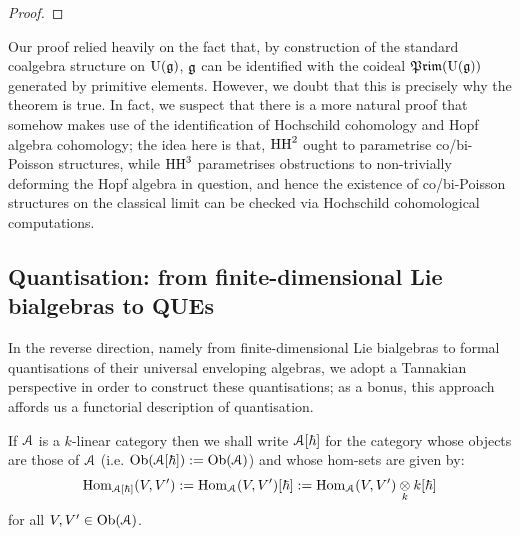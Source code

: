             \begin{proof}
                
            \end{proof}
        \begin{remark}
            Our proof relied heavily on the fact that, by construction of the standard coalgebra structure on $\mathrm{U}(\mathfrak{g})$, $\mathfrak{g}$ can be identified with the coideal $\mathfrak{Prim}(\mathrm{U}(\mathfrak{g}))$ generated by primitive elements. However, we doubt that this is precisely why the theorem is true. In fact, we suspect that there is a more natural proof that somehow makes use of the identification of Hochschild cohomology and Hopf algebra cohomology; the idea here is that, $\mathrm{HH}^2$ ought to parametrise co/bi-Poisson structures, while $\mathrm{HH}^3$ parametrises obstructions to non-trivially deforming the Hopf algebra in question, and hence the existence of co/bi-Poisson structures on the classical limit can be checked via Hochschild cohomological computations. 
        \end{remark}
    
    \subsection{Quantisation: from finite-dimensional Lie bialgebras to QUEs}
        In the reverse direction, namely from finite-dimensional Lie bialgebras to formal quantisations of their universal enveloping algebras, we adopt a Tannakian perspective in order to construct these quantisations; as a bonus, this approach affords us a functorial description of quantisation. 
        
        \begin{convention}
            If $\mathcal{A}$ is a $k$-linear category then we shall write $\mathcal{A}[\hbar]$ for the category whose objects are those of $\mathcal{A}$ (i.e. $\mathrm{Ob}(\mathcal{A}[\hbar]) := \mathrm{Ob}(\mathcal{A})$) and whose hom-sets are given by:
                $$\Hom_{\calA[\hbar]}(V, V') := \Hom_{\calA}(V, V')[\hbar] := \Hom_{\calA}(V, V') \tensor_k k[\hbar]$$
            for all $V, V' \in \mathrm{Ob}(\mathcal{A})$.
        \end{convention}
        
